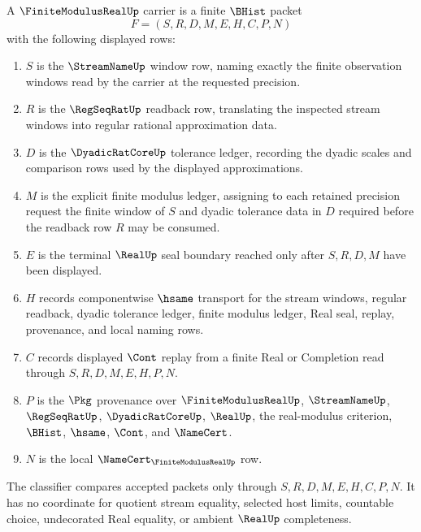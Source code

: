 \begin{definition}
\label{def:finite-modulus-real-carrier}
A $\FiniteModulusRealUp$ carrier is a finite $\BHist$ packet
$$
F=(S,R,D,M,E,H,C,P,N)
$$
with the following displayed rows:
\begin{enumerate}
\item $S$ is the $\StreamNameUp$ window row, naming exactly the finite observation windows read by the carrier at the requested precision.
\item $R$ is the $\RegSeqRatUp$ readback row, translating the inspected stream windows into regular rational approximation data.
\item $D$ is the $\DyadicRatCoreUp$ tolerance ledger, recording the dyadic scales and comparison rows used by the displayed approximations.
\item $M$ is the explicit finite modulus ledger, assigning to each retained precision request the finite window of $S$ and dyadic tolerance data in $D$ required before the readback row $R$ may be consumed.
\item $E$ is the terminal $\RealUp$ seal boundary reached only after $S,R,D,M$ have been displayed.
\item $H$ records componentwise $\hsame$ transport for the stream windows, regular readback, dyadic tolerance ledger, finite modulus ledger, Real seal, replay, provenance, and local naming rows.
\item $C$ records displayed $\Cont$ replay from a finite Real or Completion read through $S,R,D,M,E,H,P,N$.
\item $P$ is the $\Pkg$ provenance over $\FiniteModulusRealUp$, $\StreamNameUp$, $\RegSeqRatUp$, $\DyadicRatCoreUp$, $\RealUp$, the real-modulus criterion, $\BHist$, $\hsame$, $\Cont$, and $\NameCert$.
\item $N$ is the local $\NameCert_{\FiniteModulusRealUp}$ row.
\end{enumerate}
The classifier compares accepted packets only through $S,R,D,M,E,H,C,P,N$. It has no coordinate for quotient stream equality, selected host limits, countable choice, undecorated Real equality, or ambient $\RealUp$ completeness.
\end{definition}

